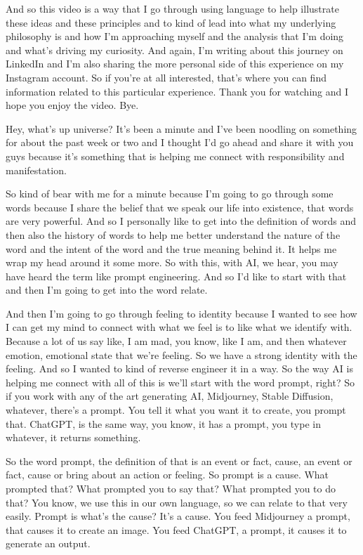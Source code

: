 \documentclass{article}
\begin{document}
\medskip

And so this video is a way that I go through using language to help illustrate these ideas
and these principles and to kind of lead into what my underlying philosophy is
and how I'm approaching myself and the analysis that I'm doing and what's driving my curiosity.
And again, I'm writing about this journey on LinkedIn and I'm also sharing the more personal
side of this experience on my Instagram account. So if you're at all interested, that's where you can find information related to this particular experience. Thank you for watching and I hope you enjoy the video. Bye. 

\medskip

Hey, what's up universe? It's been a minute and I've been noodling on something for about the past week or two and I thought I'd go ahead and share it with you guys because it's something that is helping me connect with responsibility and manifestation.

\medskip

So kind of bear with me for a minute because I'm going to go through some words because I share the belief that we speak our life into existence, that words are very powerful. And so I personally
like to get into the definition of words and then also the history of words to help me better
understand the nature of the word and the intent of the word and the true meaning behind it. It
helps me wrap my head around it some more. So with this, with AI, we hear, you may have heard
the term like prompt engineering. And so I'd like to start with that and then I'm going to get into
the word relate. 

\medskip

And then I'm going to go through feeling to identity because I wanted to see how
I can get my mind to connect with what we feel is to like what we identify with. Because a lot
of us say like, I am mad, you know, like I am, and then whatever emotion, emotional state that
we're feeling. So we have a strong identity with the feeling. And so I wanted to kind of reverse
engineer it in a way. So the way AI is helping me connect with all of this is we'll start with
the word prompt, right? So if you work with any of the art generating AI, Midjourney,
Stable Diffusion, whatever, there's a prompt. You tell it what you want it to create, you prompt
that. ChatGPT, is the same way, you know, it has a prompt, you type in whatever, it returns something.

\medskip

So the word prompt, the definition of that is an event or fact, cause, an event or fact, cause or
bring about an action or feeling. So prompt is a cause. What prompted that? What prompted you to
say that? What prompted you to do that? You know, we use this in our own language, so we can relate
to that very easily. Prompt is what's the cause? It's a cause. You feed Midjourney a prompt, that
causes it to create an image. You feed ChatGPT, a prompt, it causes it to generate an output.
\end{document}
